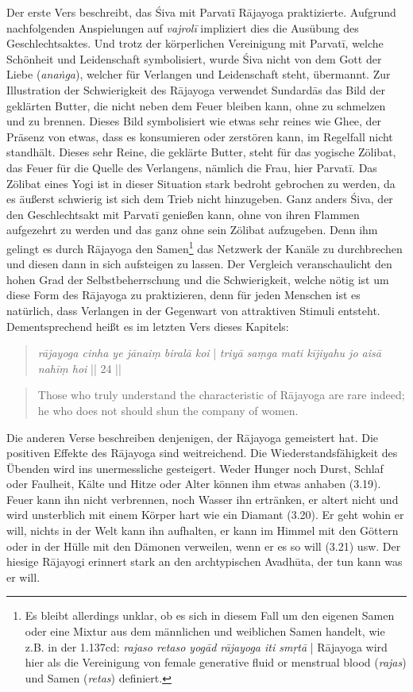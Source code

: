 Der erste Vers beschreibt, das Śiva mit Parvatī Rājayoga praktizierte. Aufgrund nachfolgenden Anspielungen auf \textit{vajrolī} impliziert dies die Ausübung des Geschlechtsaktes. Und trotz der körperlichen Vereinigung mit Parvatī, welche Schönheit und Leidenschaft symbolisiert, wurde Śiva nicht von dem Gott der Liebe (\textit{anaṅga}), welcher für Verlangen und Leidenschaft steht, übermannt. Zur Illustration der Schwierigkeit des Rājayoga verwendet Sundardās das Bild der geklärten Butter, die nicht neben dem Feuer bleiben kann, ohne zu schmelzen und zu brennen. Dieses Bild symbolisiert wie etwas sehr reines wie Ghee, der Präsenz von etwas, dass es konsumieren oder zerstören kann, im Regelfall nicht standhält. Dieses sehr Reine, die geklärte Butter, steht für das yogische Zölibat, das Feuer für die Quelle des Verlangens, nämlich die Frau, hier Parvatī. Das Zölibat eines Yogi ist in dieser Situation stark bedroht gebrochen zu werden, da es äußerst schwierig ist sich dem Trieb nicht hinzugeben. Ganz anders Śiva, der den Geschlechtsakt mit Parvatī genießen kann, ohne von ihren Flammen aufgezehrt zu werden und das ganz ohne sein Zölibat aufzugeben. Denn ihm gelingt es durch Rājayoga den Samen\footnote{Es bleibt allerdings unklar, ob es sich in diesem Fall um den eigenen Samen oder eine Mixtur aus dem männlichen und weiblichen Samen handelt, wie z.B. in der  1.137cd: \textit{rajaso retaso yogād rājayoga iti smṛtā} | Rājayoga wird hier als die Vereinigung von female generative fluid or menstrual blood (\textit{rajas}) und Samen (\textit{retas}) definiert.} das Netzwerk der Kanäle zu durchbrechen und diesen dann in sich aufsteigen zu lassen. Der Vergleich veranschaulicht den hohen Grad der Selbstbeherrschung und die Schwierigkeit, welche nötig ist um diese Form des Rājayoga zu praktizieren, denn für jeden Menschen ist es natürlich, dass Verlangen in der Gegenwart von attraktiven Stimuli entsteht. Dementsprechend heißt es im letzten Vers dieses Kapitels:

\begin{quote}
  \textit{rājayoga cinha ye jānaiṃ biralā koi} |
  \textit{triyā saṃga mati kījiyahu jo aisā nahīṃ hoi} || 24 ||
\end{quote}
\begin{quote}
Those who truly understand the characteristic of Rājayoga are rare indeed; he who does not should shun the company of women. 
\end{quote}
Die anderen Verse beschreiben denjenigen, der Rājayoga gemeistert hat. Die positiven Effekte des Rājayoga sind weitreichend. Die Wiederstandsfähigkeit des Übenden wird ins unermessliche gesteigert. Weder Hunger noch Durst, Schlaf oder Faulheit, Kälte und Hitze oder Alter können ihm etwas anhaben (3.19). Feuer kann ihn nicht verbrennen, noch Wasser ihn ertränken, er altert nicht und wird unsterblich mit einem Körper hart wie ein Diamant (3.20). Er geht wohin er will, nichts in der Welt kann ihn aufhalten, er kann im Himmel mit den Göttern oder in der Hülle mit den Dämonen verweilen, wenn er es so will (3.21) usw. Der hiesige Rājayogi erinnert stark an den archtypischen Avadhūta, der tun kann was er will.

